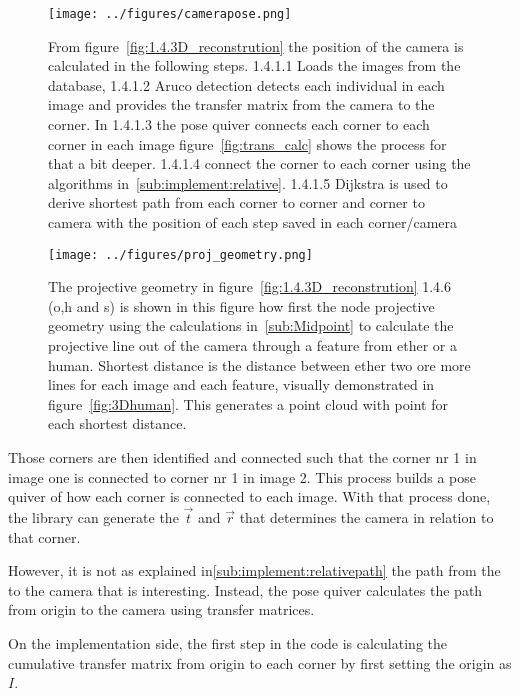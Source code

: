 \begin{figure}[ht]
\begin{center}
    \texttt{[image: ../figures/camerapose.png]}
\end{center}
\caption[1.4.1 Camera pose]{From figure~\ref{fig:1.4.3D_reconstrution} the position of the camera is calculated in the following steps. 1.4.1.1 Loads the images from the database, 1.4.1.2 Aruco detection detects each individual \aruco in each image and provides the transfer matrix from the camera to the \aruco corner. In 1.4.1.3 the pose quiver connects each corner to each corner in each image figure~\ref{fig:trans_calc} shows the process for that a bit deeper. 1.4.1.4 connect the corner to each corner using the algorithms in~\ref{sub:implement:relative}. 1.4.1.5 Dijkstra is used to derive shortest path from each corner to corner and corner to camera with the position of each step saved in each corner/camera}
\label{fig:1.4.1_camerapose}
\end{figure}


\begin{figure}[ht]
\begin{center}
    \texttt{[image: ../figures/proj\_geometry.png]}
\end{center}
\caption[1.4.6 Projection geometry]{The projective geometry in figure~\ref{fig:1.4.3D_reconstrution} 1.4.6 (o,h and s) is shown in this figure how first the node projective geometry using the calculations in~\ref{sub:Midpoint} to calculate the projective line out of the camera through a feature from ether \openpose or a human. Shortest distance is the distance between ether two ore more lines for each image and each feature, visually demonstrated in figure~\ref{fig:3Dhuman}. This generates a point cloud with point for each shortest distance.}
\label{fig:1.4.6.proj_geometry}
\end{figure}




Those corners are then identified and connected such that the corner nr 1 in image one is connected to corner nr 1 in image 2.
This process builds a pose quiver of how each corner is connected to each image.
With that process done, the \aruco{ } library can generate the $\vec{t}$ and $\vec{r}$ that determines the camera in relation to that corner.

However, it is not as explained in\ref{sub:implement:relativepath} the path from the \aruco to the camera that is interesting.
Instead, the pose quiver calculates the path from origin to the camera using transfer matrices.

On the implementation side, the first step in the code is calculating the cumulative transfer matrix from origin to each corner by first setting the origin as $I$.





